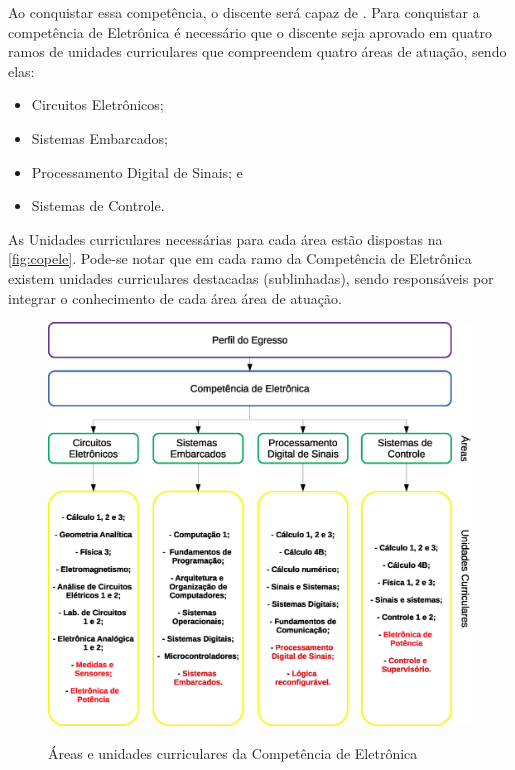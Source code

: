 Ao conquistar essa competência, o discente será capaz de \textbf{\compTron}. Para conquistar a competência de Eletrônica é necessário que o discente seja aprovado em quatro ramos de unidades curriculares que compreendem quatro áreas de atuação, sendo elas:

\begin{itemize}
    \item Circuitos Eletrônicos;
    \item Sistemas Embarcados;
    \item Processamento Digital de Sinais; e
    \item Sistemas de Controle.
\end{itemize}

As Unidades curriculares necessárias para cada área estão dispostas na \autoref{fig:copele}. Pode-se notar que em cada ramo da Competência de Eletrônica existem unidades curriculares destacadas (sublinhadas), sendo responsáveis por integrar o conhecimento de cada área área de atuação.

\begin{figure}[!htb]
    \centering
    \caption[Áreas e unidades curriculares da Competência de Eletrônica]{Áreas e unidades curriculares da Competência de Eletrônica}
    \includegraphics[width=1.0\textwidth]{Caps/Figs/comp_eletronica.eps}
    \fonte{\utf}
    \label{fig:copele}
\end{figure}

